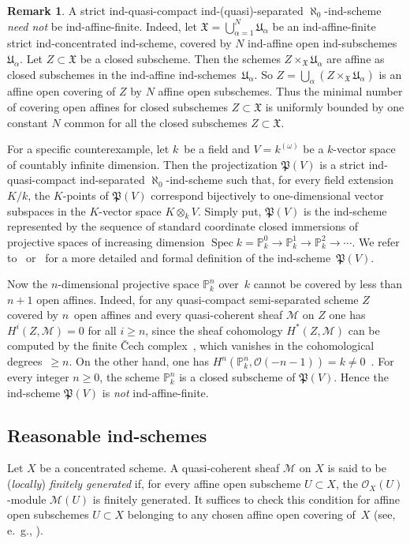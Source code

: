 \documentclass[12pt,a4paper]{amsart}
\newcommand{\+}{\protect\nobreakdash-}
\renewcommand{\:}{\colon}
\newcommand{\rarrow}{\longrightarrow}
\newcommand{\ot}{\otimes}
\DeclareMathOperator{\Spec}{Spec}
\newcommand{\cO}{\mathcal O}
\newcommand{\cM}{\mathcal M}
\newcommand{\fX}{\mathfrak X}
\newcommand{\fP}{\mathfrak P}
\newcommand{\fU}{\mathfrak U}
\newcommand{\boP}{\mathbb P}
\theoremstyle{plain}
\theoremstyle{definition}
\newtheorem{rem}[thm]{Remark}
\begin{document}
\begin{rem} \label{ind-qc-need-not-be-ind-affine-finite}
 A strict ind-quasi-compact ind-(quasi)-separated $\aleph_0$\+ind-scheme
\emph{need not} be ind-affine-finite.
 Indeed, let $\fX=\bigcup_{\alpha=1}^N\fU_\alpha$ be
an ind-affine-finite strict ind-concentrated ind-scheme, covered by $N$
ind-affine open ind-subschemes~$\fU_\alpha$.
 Let $Z\subset\fX$ be a closed subscheme.
 Then the schemes $Z\times_\fX\fU_\alpha$ are affine as closed
subschemes in the ind-affine ind-schemes~$\fU_\alpha$.
 So $Z=\bigcup_\alpha(Z\times_\fX\fU_\alpha)$ is an affine open covering
of $Z$ by $N$ affine open subschemes.
 Thus the minimal number of covering open affines for closed subschemes
$Z\subset\fX$ is uniformly bounded by one constant $N$ common for all
the closed subschemes $Z\subset\fX$.

 For a specific counterexample, let $k$~be a field and $V=k^{(\omega)}$
be a $k$\+vector space of countably infinite dimension.
 Then the projectization $\fP(V)$ is a strict ind-quasi-compact
ind-separated $\aleph_0$\+ind-scheme such that, for every field
extension $K/k$, the $K$\+points of $\fP(V)$ correspond bijectively to
one-dimensional vector subspaces in the $K$\+vector space $K\ot_kV$.
 Simply put, $\fP(V)$ is the ind-scheme represented by the sequence of
standard coordinate closed immersions of projective spaces of increasing
dimension $\Spec k=\boP^0_k\rarrow\boP^1_k\rarrow\boP^2_k\rarrow\dotsb$.
 We refer to~\cite[Example~1.3(2)]{Rich} or~\cite[Section~11.2]{Psemten}
for a more detailed and formal definition of the ind-scheme~$\fP(V)$.

 Now the $n$\+dimensional projective space $\boP^n_k$ over~$k$ cannot
be covered by less than $n+1$ open affines.
 Indeed, for any quasi-compact semi-separated scheme $Z$ covered by
$n$~open affines and every quasi-coherent sheaf $\cM$ on $Z$ one has
$H^i(Z,\cM)=0$ for all $i\ge n$, since the sheaf cohomology
$H^*(Z,\cM)$ can be computed by the finite \v Cech complex~\cite[Lemmas
Tags~01XD and~01FM]{SP}, which vanishes in the cohomological
degrees~$\ge n$.
 On the other hand, one has $H^n(\boP^n_k,\cO(-n-1))=k\ne0$
\,\cite[Lemma Tag~01XT]{SP}.
 For every integer $n\ge0$, the scheme $\boP^n_k$ is a closed
subscheme of $\fP(V)$.
 Hence the ind-scheme $\fP(V)$ is \emph{not} ind-affine-finite.
\end{rem}

\subsection{Reasonable ind-schemes}
\label{reasonable-ind-schemes-subsecn}
 Let $X$ be a concentrated scheme.
 A quasi-coherent sheaf $\cM$ on $X$ is said to be (\emph{locally})
\emph{finitely generated} if, for every affine open subscheme
$U\subset X$, the $\cO_X(U)$\+module $\cM(U)$ is finitely generated.
 It suffices to check this condition for affine open subschemes
$U\subset X$ belonging to any chosen affine open covering of~$X$
(see, e.~g., \cite[Lemma~3.1(a)]{PS6}).
\end{document}
